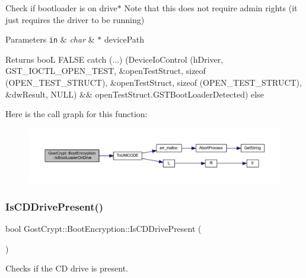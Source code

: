 Check if bootloader is on drive$\ast$ Note that this does not require admin rights (it just requires the driver to be running) 


\begin{DoxyParams}[1]{Parameters}
\mbox{\tt in}  & {\em char} & $\ast$ device\+Path \\
\hline
\end{DoxyParams}
\begin{DoxyReturn}{Returns}
booL F\+A\+L\+SE catch (...) (Device\+Io\+Control (h\+Driver, G\+S\+T\+\_\+\+I\+O\+C\+T\+L\+\_\+\+O\+P\+E\+N\+\_\+\+T\+E\+ST, \&open\+Test\+Struct, sizeof (O\+P\+E\+N\+\_\+\+T\+E\+S\+T\+\_\+\+S\+T\+R\+U\+CT), \&open\+Test\+Struct, sizeof (O\+P\+E\+N\+\_\+\+T\+E\+S\+T\+\_\+\+S\+T\+R\+U\+CT), \&dw\+Result, N\+U\+LL) \&\& open\+Test\+Struct.\+G\+S\+T\+Boot\+Loader\+Detected) else 
\end{DoxyReturn}
Here is the call graph for this function\+:
\nopagebreak
\begin{figure}[H]
\begin{center}
\leavevmode
\includegraphics[width=350pt]{class_gost_crypt_1_1_boot_encryption_a448f5e8fc2f4463a8147f702c2e2d217_cgraph}
\end{center}
\end{figure}
\mbox{\label{class_gost_crypt_1_1_boot_encryption_a050dbc6e24852e929a083acfdbe1d43d}} 
\subsubsection{\texorpdfstring{Is\+C\+D\+Drive\+Present()}{IsCDDrivePresent()}}
{\footnotesize\ttfamily bool Gost\+Crypt\+::\+Boot\+Encryption\+::\+Is\+C\+D\+Drive\+Present (\begin{DoxyParamCaption}{ }\end{DoxyParamCaption})}



Checks if the CD drive is present. 

